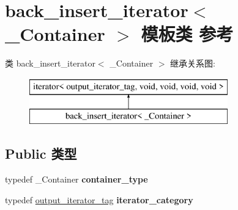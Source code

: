 \hypertarget{classback__insert__iterator}{}\section{back\+\_\+insert\+\_\+iterator$<$ \+\_\+\+Container $>$ 模板类 参考}
\label{classback__insert__iterator}
类 back\+\_\+insert\+\_\+iterator$<$ \+\_\+\+Container $>$ 继承关系图\+:\begin{figure}[H]
\begin{center}
\leavevmode
\includegraphics[height=2.000000cm]{classback__insert__iterator}
\end{center}
\end{figure}
\subsection*{Public 类型}
\begin{DoxyCompactItemize}
\item 
\mbox{\label{classback__insert__iterator_a1ec249c04d6ca754fe3a2db537f420e2}} 
typedef \+\_\+\+Container {\bfseries container\+\_\+type}
\item 
\mbox{\label{classback__insert__iterator_ae600da8c153abd34362ffa10c2390dce}} 
typedef \hyperlink{structoutput__iterator__tag}{output\+\_\+iterator\+\_\+tag} {\bfseries iterator\+\_\+category}
\end{DoxyCompactItemize}
